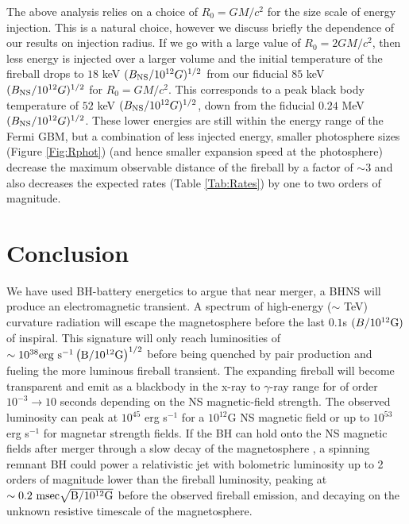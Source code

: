 The above analysis relies on a choice of $R_0=GM/c^2$ for the size
scale of energy injection. This is a natural choice, however we
discuss briefly the dependence of our results on
injection radius. If we go with a large value of $R_0=2GM/c^2$, then less energy is injected
over a larger volume and the initial temperature of the fireball drops
to $18$ keV $(B_{\rm NS}/10^{12} G )^{1/2}$ from our fiducial $85$ keV
$(B_{\rm NS}/10^{12} G )^{1/2}$ for $R_0=GM/c^2$. This corresponds to
a peak black body temperature of $52$ keV $(B_{\rm NS}/10^{12} G
)^{1/2}$, down from the fiducial $0.24$ MeV $(B_{\rm NS}/10^{12} G
)^{1/2}$. These lower energies are still within the energy range of
the Fermi GBM, but a combination of less injected energy, smaller
photosphere sizes (Figure \ref{Fig:Rphot}) (and hence smaller
expansion speed at the photosphere) decrease the maximum observable
distance of the fireball by a factor of $\sim3$ and also decreases the
expected rates (Table \ref{Tab:Rates}) by one to two orders of
magnitude.

\section{Conclusion}
We have used BH-battery energetics to argue that near merger, a BHNS
will produce an electromagnetic transient.  A spectrum of high-energy
($\sim$ TeV) curvature radiation will escape the magnetosphere before
the last $0.1$s $(B/10^{12}\rm{G})$ of inspiral. This signature will
only reach luminosities of $\sim 10^{38} \rm{erg} \ \rm{s}^{-1}
\left(B/10^{12}\rm{G}\right)^{1/2}$ before being quenched by
pair production and fueling the more luminous fireball transient.  The
expanding fireball will become transparent and emit as a blackbody in
the x-ray to $\gamma$-ray range for of order $10^{-3} \rightarrow 10$
seconds depending on the NS magnetic-field strength. The observed
luminosity can peak at $10^{45}$ erg s$^{-1}$ for a $10^{12}$G NS
magnetic field or up to $10^{53}$ erg s$^{-1}$ for magnetar strength
fields. If the BH can hold onto the NS magnetic fields after merger
through a slow decay of the magnetosphere
\citep{LyutikovMckinney:2011}, a spinning remnant BH could power a
relativistic jet with bolometric luminosity up to 2 orders of
magnitude lower than the fireball luminosity, peaking at $ \sim 0.2
\ \rm{msec} \sqrt{B/10^{12}\rm{G}}$ before the observed fireball
emission, and decaying on the unknown resistive timescale of the
magnetosphere.




